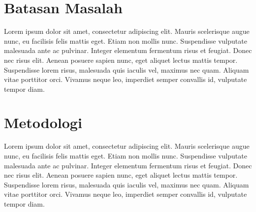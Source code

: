 \section{Batasan Masalah}

Lorem ipsum dolor sit amet, consectetur adipiscing elit. Mauris scelerisque augue nunc, eu facilisis felis mattis eget. Etiam non mollis nunc. Suspendisse vulputate malesuada ante ac pulvinar. Integer elementum fermentum risus et feugiat. Donec nec risus elit. Aenean posuere sapien nunc, eget aliquet lectus mattis tempor. Suspendisse lorem risus, malesuada quis iaculis vel, maximus nec quam. Aliquam vitae porttitor orci. Vivamus neque leo, imperdiet semper convallis id, vulputate tempor diam.

\section{Metodologi}

Lorem ipsum dolor sit amet, consectetur adipiscing elit. Mauris scelerisque augue nunc, eu facilisis felis mattis eget. Etiam non mollis nunc. Suspendisse vulputate malesuada ante ac pulvinar. Integer elementum fermentum risus et feugiat. Donec nec risus elit. Aenean posuere sapien nunc, eget aliquet lectus mattis tempor. Suspendisse lorem risus, malesuada quis iaculis vel, maximus nec quam. Aliquam vitae porttitor orci. Vivamus neque leo, imperdiet semper convallis id, vulputate tempor diam.
